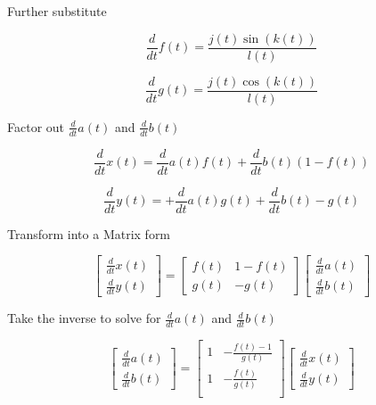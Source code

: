 \documentclass{article}
\begin{document}
Further substitute

\[
    \frac{d}{d t} f{(t )} = \frac{j(t) \sin({k(t)})}{l(t)}
\]

\[
    \frac{d}{d t} g{(t )} = \frac{j(t) \cos({k(t)})}{l(t)}
\]

Factor out $ \frac{d}{d t} a{(t )} $ and $ \frac{d}{d t} b{(t )} $

\[
    \frac{d}{d t} x{(t )} =  \frac{d}{d t} a{(t )} f(t) + \frac{d}{d t} b{(t )} ( 1 - f(t))
\]

\[
    \frac{d}{d t} y{(t )} =  + \frac{d}{d t} a{(t )} g(t) + \frac{d}{d t} b{(t )}  - g(t)
\]

Transform into a Matrix form

\[
    \begin{bmatrix}
    \frac{d}{d t} x{(t )} \\ 
    \frac{d}{d t} y{(t )}
    \end{bmatrix}
    =
    \begin{bmatrix}
    f(t) & 1-f(t) \\ 
    g(t) & -g(t)
    \end{bmatrix}
    \begin{bmatrix}
    \frac{d}{d t} a{(t )} \\ 
    \frac{d}{d t} b{(t )}
    \end{bmatrix}
\]

Take the inverse to solve for $ \frac{d}{d t} a{(t )} $ and $ \frac{d}{d t} b{(t )} $

\[
    \begin{bmatrix}
    \frac{d}{d t} a{(t )} \\ 
    \frac{d}{d t} b{(t )}
    \end{bmatrix}
    =
    \begin{bmatrix}
    1 & -\frac{f(t)-1}{g(t)} \\
    1 & -\frac{f(t)}{g(t)} \\
    \end{bmatrix}
    \begin{bmatrix}
    \frac{d}{d t} x{(t )} \\ 
    \frac{d}{d t} y{(t )}
    \end{bmatrix}
\]
\end{document}
